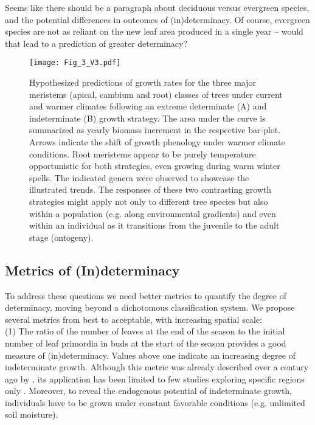 \documentclass{article}
\begin{document}
 Seems like there should be a paragraph about deciduous versus evergreen species, and the potential differences in outcomes of (in)determinacy. Of course, evergreen species are not as reliant on the new leaf area produced in a single year – would that lead to a prediction of greater determinacy?

							\begin{figure}
							\centering
							\texttt{[image: Fig\_3\_V3.pdf]} 
							\caption{Hypothesized predictions of growth rates for the three major meristems (apical, cambium and root) classes of trees under current and warmer climates following an extreme determinate (A) and indeterminate (B) growth strategy. The area under the curve is summarized as yearly biomass increment in the respective bar-plot. Arrows indicate the shift of growth phenology under warmer climate conditions. Root meristems appear to be purely temperature opportunistic for both strategies, even growing during warm winter spells. The indicated genera were observed to showcase the illustrated trends. The responses of these two contrasting growth strategies might apply not only to different tree species but also within a population (e.g. along environmental gradients) and even within an individual as it transitions from the juvenile to the adult stage (ontogeny).}
							\label{fig:fig_3xxx}
						\end{figure}

	
	\subsection*{Metrics of (In)determinacy}
	To address these questions we need better metrics to quantify the degree of determinacy, moving beyond a dichotomous classification system. We propose several metrics from best to acceptable, with increasing spatial scale: \\
	
	(1) The ratio of the number of leaves at the end of the season to the initial number of leaf primordia in buds at the start of the season provides a good measure of (in)determinacy. Values above one indicate an increasing degree of indeterminate growth. Although this metric was already described over a century ago by \citet{mooreStudyWinterBuds1909}, its application has been limited to few studies exploring specific regions only \citep{damascosBudCompositionBranching2005, kikuzawaLeafSurvivalWoody1983, guedonRelativeExtentsPreformation2006}. Moreover, to reveal the endogenous potential of indeterminate growth, individuals have to be grown under constant favorable conditions (e.g. unlimited soil moisture).\\
	
\end{document}
